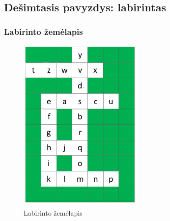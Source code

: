 \subsection{Dešimtasis pavyzdys: labirintas}

\subsubsection{Labirinto žemėlapis}

\begin{figure}[H]
  \centering
  \includegraphics[]{content/map.png}
  \caption{Labirinto žemėlapis}
  \label{fig:fc:map}
\end{figure}

